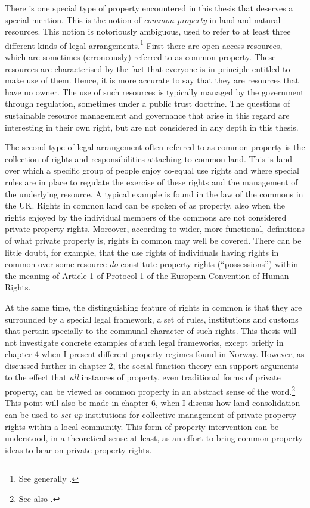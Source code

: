 {There is one special type of property encountered in this thesis that deserves a special mention. This is the notion of {\it common property} in land and natural resources. This notion is notoriously ambiguous, used to refer to at least three different kinds of legal arrangements.\footnote{See generally \cite{fennel11}.} First there are open-access resources, which are sometimes (erroneously) referred to as common property. These resources are characterised by the fact that everyone is in principle entitled to make use of them. Hence, it is more accurate to say that they are resources that have no owner. The use of such resources is typically managed by the government through regulation, sometimes under a public trust doctrine. The questions of sustainable resource management and governance that arise in this regard are interesting in their own right, but are not considered in any depth in this thesis.

The second type of legal arrangement often referred to as common property is the collection of rights and responsibilities attaching to common land. This is land over which a specific group of people enjoy co-equal use rights and where special rules are in place to regulate the exercise of these rights and the management of the underlying resource. A typical example is found in the law of the commons in the UK. Rights in common land can be spoken of as property, also when the rights enjoyed by the individual members of the commons are not considered private property rights. Moreover, according to wider, more functional, definitions of what private property is, rights in common may well be covered. There can be little doubt, for example, that the use rights of individuals having rights in common over some resource {\it do} constitute property rights (``possessions'') within the meaning of Article 1 of Protocol 1 of the European Convention of Human Rights. 

At the same time, the distinguishing feature of rights in common is that they are surrounded by a special legal framework, a set of rules, institutions and customs that pertain specially to the communal character of such rights. This thesis will not investigate concrete examples of such legal frameworks, except briefly in chapter 4 when I present different property regimes found in Norway. However, as discussed further in chapter 2, the social function theory can support arguments to the effect that {\it all} instances of property, even traditional forms of private property, can be viewed as common property in an abstract sense of the word.\footnote{See also \cite{fennel11}.} This point will also be made in chapter 6, when I discuss how land consolidation can be used to {\it set up} institutions for collective management of private property rights within a local community. This form of property intervention can be understood, in a theoretical sense at least, as an effort to bring common property ideas to bear on private property rights.

}
